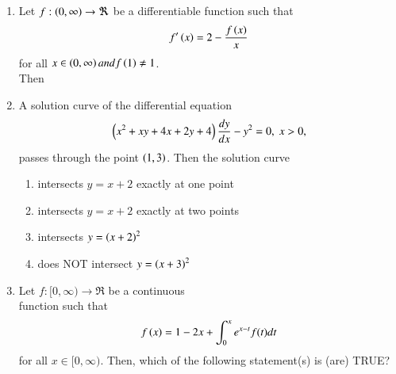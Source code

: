 \documentclass[journal,12pt,twocolumn,article]{IEEEtran}
\theoremstyle{remark}
\begin{document}
\begin{enumerate}[start = 6]
\begin{enumerate}
\end{enumerate}
\item Let $f:\left(0,\infty\right) \rightarrow \Re$ be a differentiable function such that 
\begin{align*}
f^\prime\left(x\right) = 2-\frac{f\left(x\right)}{x}
\end{align*} for all $x \in \left(0,\infty\right) and f\left(1\right) \neq 1$. \\Then
\hfill{}
\begin{enumerate}
\end{enumerate}
\item A solution curve of the differential equation 
\begin{align*}
\left(x^2+xy+4x+2y+4\right)\frac{dy}{dx}-y^2=0,\;x>0,
\end{align*} passes through the point $\left(1,3\right)$. Then the solution curve
\hfill{}
\begin{enumerate}
\item intersects $y=x+2$ exactly at one point
\item intersects $y=x+2$ exactly at two points
\item intersects $y=\left(x+2\right)^2$ 
\item does NOT intersect $y=\left(x+3\right)^2$
\end{enumerate}
\item Let $f:[0,\infty)\rightarrow \Re$ be a continuous \\function such that
\begin{align*}
f\left(x\right) = 1-2x+ \int_0^x e^{x-t} f(t) dt
\end{align*} for all $x\in[0,\infty)$. Then, which of the following statement(s) is (are) TRUE?

\end{enumerate}
\end{document}
